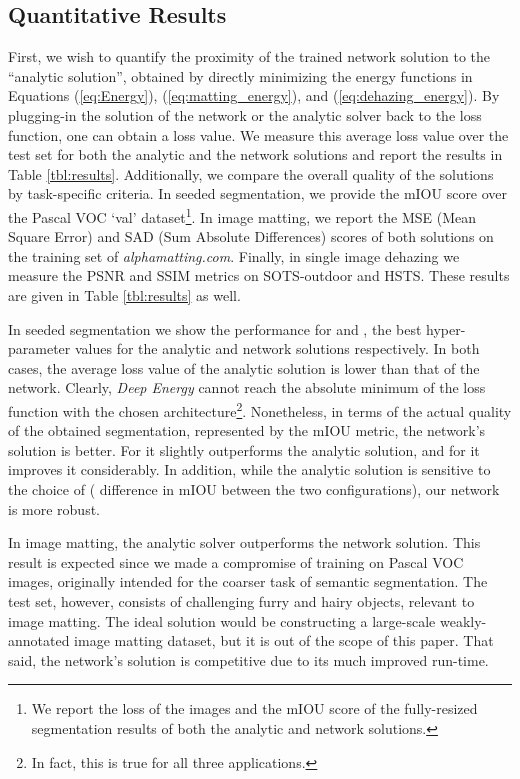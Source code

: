\documentclass[journal]{IEEEtran}
\begin{document}
\subsection{Quantitative Results} \label{ss:quantitative}

First, we wish to quantify the proximity of the trained network solution to the ``analytic solution'', obtained by directly minimizing the energy functions in Equations (\ref{eq:Energy}), (\ref{eq:matting_energy}), and (\ref{eq:dehazing_energy}). By plugging-in the solution of the network or the analytic solver back to the loss function, one can obtain a loss value. We measure this average loss value over the test set for both the analytic and the network solutions and report the results in Table \ref{tbl:results}. Additionally, we compare the overall quality of the solutions by task-specific criteria. In seeded segmentation, we provide the mIOU score over the Pascal VOC `val' dataset\footnote{We report the loss of the  images and the mIOU score of the fully-resized segmentation results of both the analytic and network solutions.}. In image matting, we report the MSE (Mean Square Error) and SAD (Sum Absolute Differences) scores of both solutions on the training set of \textit{alphamatting.com}. Finally, in single image dehazing we measure the PSNR and SSIM metrics on SOTS-outdoor and HSTS. These results are given in Table \ref{tbl:results} as well.

In seeded segmentation we show the performance for  and , the best hyper-parameter values for the analytic and network solutions respectively. In both cases, the average loss value of the analytic solution is lower than that of the network. Clearly, \emph{Deep Energy} cannot reach the absolute minimum of the loss function with the chosen architecture\footnote{In fact, this is true for all three applications.}. Nonetheless, in terms of the actual quality of the obtained segmentation, represented by the mIOU metric, the network's solution is better. For  it slightly outperforms the analytic solution, and for  it improves it considerably. In addition, while the analytic solution is sensitive to the choice of  ( difference in mIOU between the two configurations), our network is more robust. 

In image matting, the analytic solver outperforms the network solution. This result is expected since we made a compromise of training on Pascal VOC images, originally intended for the coarser task of semantic segmentation. The test set, however, consists of challenging furry and hairy objects, relevant to image matting. The ideal solution would be constructing a large-scale weakly-annotated image matting dataset, but it is out of the scope of this paper. That said, the network's solution is competitive due to its much improved run-time. 
\end{document}
